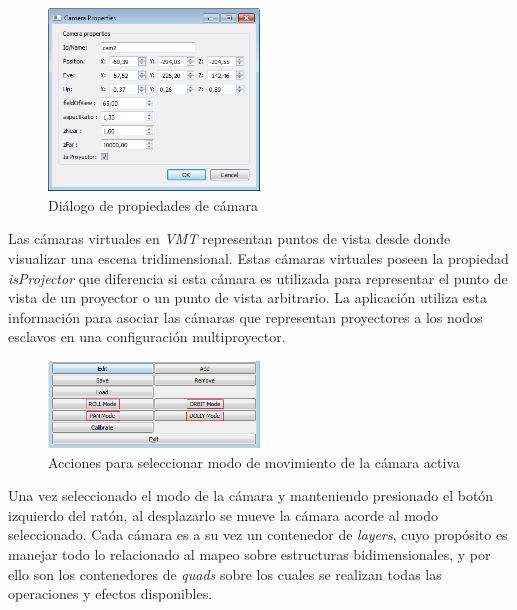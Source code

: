 \begin{figure}[H]
  \centering
    \includegraphics[width=0.5\textwidth]{./Cap5_vmt/vmt_cameraProperties.png}
  \caption{Diálogo de propiedades de cámara}
  \label{fig:VMT-CameraProperties}
\end{figure}

Las cámaras virtuales en \emph{VMT} representan puntos de vista desde donde visualizar una escena tridimensional. Estas cámaras virtuales poseen la propiedad \emph{isProjector} que diferencia si esta cámara es utilizada para representar el punto de vista de un proyector o un punto de vista arbitrario. La aplicación utiliza esta información para asociar las cámaras que representan proyectores a los nodos esclavos en una configuración multiproyector.

\begin{figure}[H]
  \centering
    \includegraphics[width=0.5\textwidth]{./Cap5_vmt/vmt_SceneBotonera.png}
  \caption{Acciones para seleccionar modo de movimiento de la cámara activa}
  \label{fig:VMT-CameraActions}
\end{figure}

Una vez seleccionado el modo de la cámara y manteniendo presionado el botón izquierdo del ratón, al desplazarlo se mueve la cámara acorde al modo seleccionado.
Cada cámara es a su vez un contenedor de \emph{layers}, cuyo propósito es manejar todo lo relacionado al mapeo sobre estructuras bidimensionales, y por ello son los contenedores de \emph{quads} sobre los cuales se realizan todas las operaciones y efectos disponibles.


